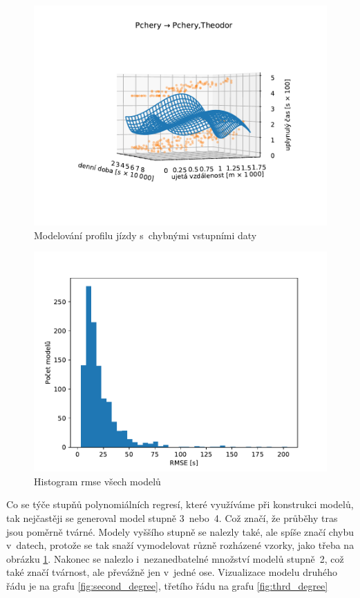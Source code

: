 \begin{figure}
   \centering
 \includegraphics[width=\linewidth]{../img/134_135}
 \caption{Modelování profilu jízdy s~chybnými vstupními daty}
 \label{fig:chyba_zpozdeni_v_posledni_zastavce}
\end{figure}


\begin{figure}
   \centering
 \includegraphics[width=\linewidth]{../img/rmse}
 \caption{Histogram \gls{rmse} všech modelů}
 \label{fig:rmse}
\end{figure}


\bigbreak

Co se týče stupňů polynomiálních regresí, které využíváme při konstrukci modelů, tak nejčastěji se generoval model stupně 3~nebo~4. Což značí, že průběhy tras jsou poměrně tvárné. Modely vyššího stupně se nalezly také, ale spíše značí chybu v~datech, protože se tak snaží vymodelovat různě rozházené vzorky, jako třeba na obrázku \ref{fig:chyba_zpozdeni_v_posledni_zastavce}. Nakonec se nalezlo i~nezanedbatelné množství modelů stupně~2, což také značí tvárnost, ale převážně jen v~jedné ose. Vizualizace modelu druhého řádu je na grafu \ref{fig:second_degree}, třetího řádu na grafu \ref{fig:thrd_degree}


